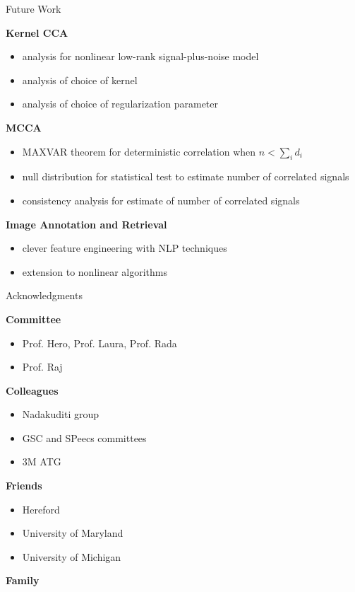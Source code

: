 \documentclass[8pt]{beamer}
\begin{document}
\begin{frame}{Future Work}


\textbf{Kernel CCA}
\begin{itemize}
\item analysis for nonlinear low-rank signal-plus-noise model
\item analysis of choice of kernel
\item analysis of choice of regularization parameter
\end{itemize}

\vspace{2ex}

\textbf{MCCA}
\begin{itemize}
\item MAXVAR theorem for deterministic correlation when $n<\sum_i d_i$ 
\item null distribution for statistical test to estimate number of correlated signals
\item consistency analysis for estimate of number of correlated signals
\end{itemize}

\vspace{2ex}

\textbf{Image Annotation and Retrieval}
\begin{itemize}
\item clever feature engineering with NLP techniques 
\item extension to nonlinear algorithms
\end{itemize}



\end{frame}

\begin{frame}{Acknowledgments}

\textbf{Committee}
\begin{itemize}
\item Prof. Hero, Prof. Laura, Prof. Rada
\item Prof. Raj
\end{itemize}

\vspace{2ex}

\textbf{Colleagues}
\begin{itemize}
\item Nadakuditi group
\item GSC and SPeecs committees 
\item 3M ATG
\end{itemize}

\vspace{2ex}

\textbf{Friends}
\begin{itemize}
\item Hereford
\item University of Maryland
\item University of Michigan
\end{itemize}

\vspace{2ex}

\textbf{Family}

\end{frame}
\end{document}
